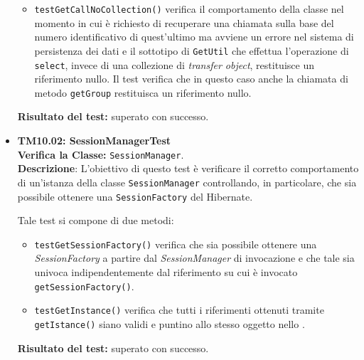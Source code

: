 \begin{itemize}
\begin{itemize}
\item \texttt{testGetCallNoCollection()} verifica il comportamento della classe nel momento in cui è richiesto di recuperare una chiamata sulla base del numero identificativo di quest'ultimo ma avviene un errore nel sistema di persistenza dei dati e il sottotipo di \texttt{GetUtil} che effettua l'operazione di \texttt{select}, invece di una collezione di \textit{transfer object}, restituisce un riferimento nullo. Il test verifica che in questo caso anche la chiamata di metodo \texttt{getGroup} restituisca un riferimento nullo.
\end{itemize} 
\textbf{Risultato del test:} superato con successo.

\item \textbf{TM10.02: SessionManagerTest}\\
\textbf{Verifica la Classe:} \texttt{SessionManager}.\\
\textbf{Descrizione}: L'obiettivo di questo test è verificare il corretto comportamento di un'istanza della classe \texttt{SessionManager} controllando, in particolare, che sia possibile ottenere una \texttt{SessionFactory} del  Hibernate.

Tale test si compone di due metodi: 
\begin{itemize}
\item \texttt{testGetSessionFactory()} verifica che sia possibile ottenere una \textit{SessionFactory} a partire dal \textit{SessionManager} di invocazione e che tale sia univoca indipendentemente dal riferimento su cui è invocato \texttt{getSessionFactory()}.

\item \texttt{testGetInstance()} verifica che tutti i riferimenti ottenuti tramite \texttt{getIstance()} siano validi e puntino allo stesso oggetto nello .


\end{itemize}
\textbf{Risultato del test:} superato con successo.
\end{itemize}


